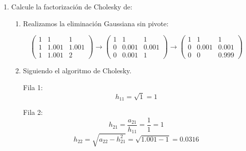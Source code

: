 \begin{enumerate}[]
    \item Calcule la factorización de Cholesky de: 
        \begin{enumerate}[]
            
            \item Realizamos la eliminación Gaussiana sin pivote:
            
            \begin{equation}
                \begin{pmatrix}
                    1 & 1     & 1     \\ 
                    1 & 1.001 & 1.001 \\ 
                    1 & 1.001 & 2
                \end{pmatrix}
                \rightarrow 
                \begin{pmatrix}
                    1 & 1     & 1     \\ 
                    0 & 0.001 & 0.001 \\ 
                    0 & 0.001 & 1
                \end{pmatrix}
                \rightarrow 
                \begin{pmatrix}
                    1 & 1     & 1     \\ 
                    0 & 0.001 & 0.001 \\ 
                    0 & 0     & 0.999
                \end{pmatrix}
            \end{equation}

            \item Siguiendo el algoritmo de Cholesky.
            
            Fila 1:
            \begin{equation}
                h_{11} = \sqrt{1} = 1
            \end{equation}
            
            Fila 2:
            \begin{equation}
                h_{21} = \frac{a_{21}}{h_{11}} = \frac{1}{1} = 1
            \end{equation}
            \begin{equation}
                h_{22} = \sqrt{a_{22} - h_{21}^2} = \sqrt{ 1.001 - 1} = 0.0316
            \end{equation}
            

\end{enumerate}
\end{enumerate}
